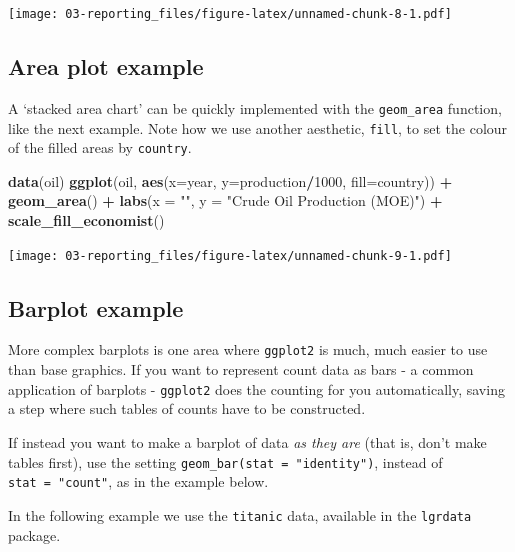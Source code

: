 \documentclass[]{book}
\newenvironment{Shaded}{\begin{snugshade}}{\end{snugshade}}
\newcommand{\DataTypeTok}[1]{\textcolor[rgb]{0.13,0.29,0.53}{#1}}
\newcommand{\DecValTok}[1]{\textcolor[rgb]{0.00,0.00,0.81}{#1}}
\newcommand{\KeywordTok}[1]{\textcolor[rgb]{0.13,0.29,0.53}{\textbf{#1}}}
\newcommand{\NormalTok}[1]{#1}
\newcommand{\OperatorTok}[1]{\textcolor[rgb]{0.81,0.36,0.00}{\textbf{#1}}}
\newcommand{\StringTok}[1]{\textcolor[rgb]{0.31,0.60,0.02}{#1}}
\begin{document}
\texttt{[image: 03-reporting\_files/figure-latex/unnamed-chunk-8-1.pdf]}

\hypertarget{area-plot-example}{%
\subsection{Area plot example}\label{area-plot-example}}

A `stacked area chart' can be quickly implemented with the \texttt{geom\_area} function, like the next example. Note how we use another aesthetic, \texttt{fill}, to set the colour of the filled areas by \texttt{country}.

\begin{Shaded}
\begin{Highlighting}[]
\KeywordTok{data}\NormalTok{(oil)}
\KeywordTok{ggplot}\NormalTok{(oil, }\KeywordTok{aes}\NormalTok{(}\DataTypeTok{x=}\NormalTok{year, }\DataTypeTok{y=}\NormalTok{production}\OperatorTok{/}\DecValTok{1000}\NormalTok{, }\DataTypeTok{fill=}\NormalTok{country)) }\OperatorTok{+}\StringTok{ }
\StringTok{  }\KeywordTok{geom_area}\NormalTok{() }\OperatorTok{+}\StringTok{ }
\StringTok{  }\KeywordTok{labs}\NormalTok{(}\DataTypeTok{x =} \StringTok{""}\NormalTok{, }\DataTypeTok{y =} \StringTok{"Crude Oil Production (MOE)"}\NormalTok{) }\OperatorTok{+}
\StringTok{  }\KeywordTok{scale_fill_economist}\NormalTok{()}
\end{Highlighting}
\end{Shaded}

\texttt{[image: 03-reporting\_files/figure-latex/unnamed-chunk-9-1.pdf]}

\hypertarget{barplot-example}{%
\subsection{Barplot example}\label{barplot-example}}

More complex barplots is one area where \texttt{ggplot2} is much, much easier to use than base graphics. If you want to represent count data as bars - a common application of barplots - \texttt{ggplot2} does the counting for you automatically, saving a step where such tables of counts have to be constructed.

If instead you want to make a barplot of data \emph{as they are} (that is, don't make tables first), use the setting \texttt{geom\_bar(stat\ =\ "identity")}, instead of \texttt{stat\ =\ "count"}, as in the example below.

In the following example we use the \texttt{titanic} data, available in the \texttt{lgrdata} package.
\end{document}

